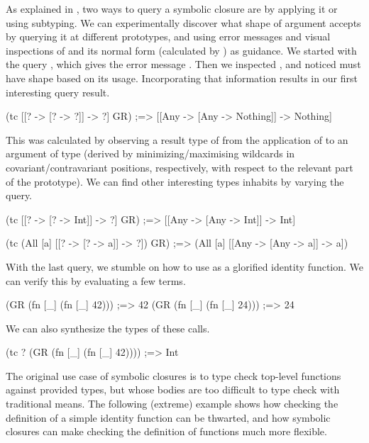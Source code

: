 \documentclass[11pt,final]{iuthesis}
\begin{document}
As explained in , two ways
to query a symbolic closure are by applying it or using subtyping.
We can experimentally discover what shape of argument \GRterm accepts 
by querying it at different prototypes, and using error messages and
visual inspections of \GRterm and its normal form (calculated by \GRclosure) as guidance.
We started with the query , which
gives the error message .
Then we inspected \GRclosure, and noticed 
must have shape \clj{[? -> [? -> ?]]} based on its usage.
Incorporating that information results in our first interesting query result.

\begin{cljlisting}
(tc [[? -> [? -> ?]] -> ?]
    GR)
;=> [[Any -> [Any -> Nothing]] -> Nothing]
\end{cljlisting}

This was calculated by observing a result type of 
from the application of \GRclosure to an argument of type 
(derived by minimizing/maximising wildcards 
in covariant/contravariant positions, respectively, with respect to the relevant part of the prototype).
We can find other interesting types \GRclosure inhabits by varying the query.

\begin{cljlisting}
(tc [[? -> [? -> Int]] -> ?]
    GR)
;=> [[Any -> [Any -> Int]] -> Int]

(tc (All [a] [[? -> [? -> a]] -> ?])
    GR)
;=> (All [a] [[Any -> [Any -> a]] -> a])
\end{cljlisting}

With the last query, we stumble on how to use \GRterm as a glorified identity function.
We can verify this by evaluating a few terms.

\begin{cljlisting}
(GR (fn [_] (fn [_] 42))) ;=> 42
(GR (fn [_] (fn [_] 24))) ;=> 24
\end{cljlisting}

We can also synthesize the types of these calls.

\begin{cljlisting}
(tc ? (GR (fn [_] (fn [_] 42))))
;=> Int
\end{cljlisting}

The original use case of symbolic closures is to type check
top-level functions against provided types,
but whose bodies are too difficult to type check with traditional means.
The following (extreme) example shows how checking the definition
of a simple identity function can be thwarted, and how symbolic closures
can make checking the definition of functions much more flexible.
\end{document}
